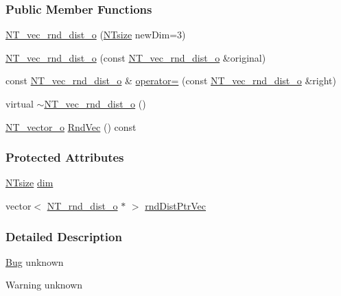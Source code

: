 \subsubsection*{Public Member Functions}
\begin{DoxyCompactItemize}
\item 
\hyperlink{class_n_t__vec__rnd__dist__o_a5783b33fc533bcdb6add5a1a3e4fc650}{NT\_\-vec\_\-rnd\_\-dist\_\-o} (\hyperlink{nt__types_8h_a06c124f2e4469769b58230253ce0560b}{NTsize} newDim=3)
\item 
\hyperlink{class_n_t__vec__rnd__dist__o_a397d404da271184bd1373e87029a9d75}{NT\_\-vec\_\-rnd\_\-dist\_\-o} (const \hyperlink{class_n_t__vec__rnd__dist__o}{NT\_\-vec\_\-rnd\_\-dist\_\-o} \&original)
\item 
const \hyperlink{class_n_t__vec__rnd__dist__o}{NT\_\-vec\_\-rnd\_\-dist\_\-o} \& \hyperlink{class_n_t__vec__rnd__dist__o_a327aabe90bb2247efabbe967f8eb6a6b}{operator=} (const \hyperlink{class_n_t__vec__rnd__dist__o}{NT\_\-vec\_\-rnd\_\-dist\_\-o} \&right)
\item 
virtual \hyperlink{class_n_t__vec__rnd__dist__o_a7c3086a6eda94035d6d49e31fddcb02b}{$\sim$NT\_\-vec\_\-rnd\_\-dist\_\-o} ()
\item 
\hyperlink{class_n_t__vector__o}{NT\_\-vector\_\-o} \hyperlink{class_n_t__vec__rnd__dist__o_a21d46c90d40d58e7c1fb5b646cdba739}{RndVec} () const 
\end{DoxyCompactItemize}
\subsubsection*{Protected Attributes}
\begin{DoxyCompactItemize}
\item 
\hyperlink{nt__types_8h_a06c124f2e4469769b58230253ce0560b}{NTsize} \hyperlink{class_n_t__vec__rnd__dist__o_a708a77a7d135e0dec8201b36c0a55fa2}{dim}
\item 
vector$<$ \hyperlink{class_n_t__rnd__dist__o}{NT\_\-rnd\_\-dist\_\-o} $\ast$ $>$ \hyperlink{class_n_t__vec__rnd__dist__o_adad8eecb4019a95d9d3886833670b16c}{rndDistPtrVec}
\end{DoxyCompactItemize}


\subsubsection{Detailed Description}
\begin{Desc}
\item[\hyperlink{bug__bug000111}{Bug}]unknown \end{Desc}
\begin{DoxyWarning}{Warning}
unknown 
\end{DoxyWarning}


